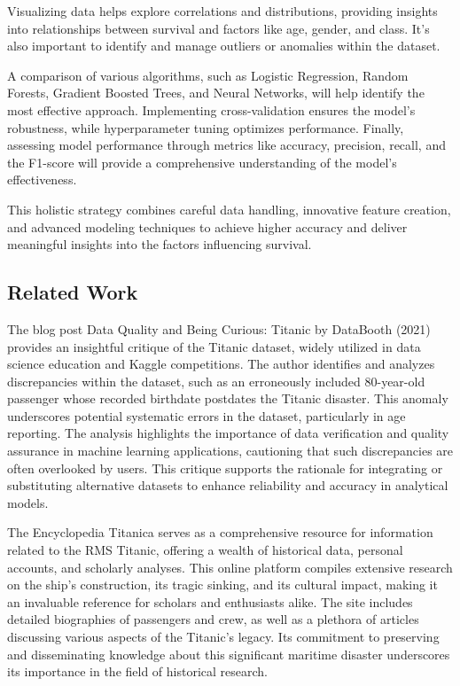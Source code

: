 \documentclass[conference]{IEEEtran}
\begin{document}
Visualizing data helps explore correlations and distributions, providing insights into relationships between survival and factors like age, gender, and class. It's also important to identify and manage outliers or anomalies within the dataset. 

A comparison of various algorithms, such as Logistic Regression, Random Forests, Gradient Boosted Trees, and Neural Networks, will help identify the most effective approach. Implementing cross-validation ensures the model's robustness, while hyperparameter tuning optimizes performance. Finally, assessing model performance through metrics like accuracy, precision, recall, and the F1-score will provide a comprehensive understanding of the model's effectiveness.

This holistic strategy combines careful data handling, innovative feature creation, and advanced modeling techniques to achieve higher accuracy and deliver meaningful insights into the factors influencing survival.

\subsection{Related Work}

The blog post Data Quality and Being Curious: Titanic by DataBooth (2021) provides an insightful critique of the Titanic dataset, widely utilized in data science education and Kaggle competitions\cite{databoothDataQuality}. The author identifies and analyzes discrepancies within the dataset, such as an erroneously included 80-year-old passenger whose recorded birthdate postdates the Titanic disaster. This anomaly underscores potential systematic errors in the dataset, particularly in age reporting\cite{databoothDataQuality}. The analysis highlights the importance of data verification and quality assurance in machine learning applications, cautioning that such discrepancies are often overlooked by users. This critique supports the rationale for integrating or substituting alternative datasets to enhance reliability and accuracy in analytical models.

The Encyclopedia Titanica\cite{encyclopediatitanicaEncyclopediaTitanica} serves as a comprehensive resource for information related to the RMS Titanic, offering a wealth of historical data, personal accounts, and scholarly analyses. This online platform compiles extensive research on the ship's construction, its tragic sinking, and its cultural impact, making it an invaluable reference for scholars and enthusiasts alike. The site includes detailed biographies of passengers and crew, as well as a plethora of articles discussing various aspects of the Titanic's legacy. Its commitment to preserving and disseminating knowledge about this significant maritime disaster underscores its importance in the field of historical research.
\end{document}
